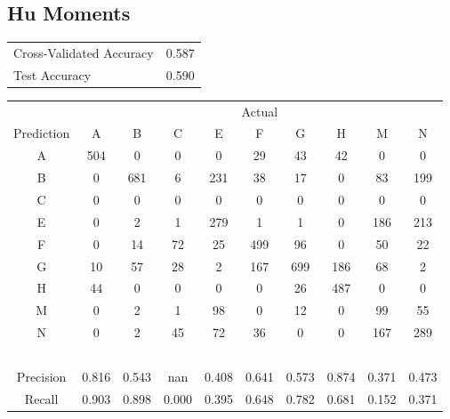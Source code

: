 \documentclass[12pt]{article}
\begin{document}
\newpage
\subsection*{Hu Moments}

\begin{center}
	\begin{tabular}{l|c}
	Cross-Validated Accuracy & 0.587 \\
	Test Accuracy & 0.590 \\
	\end{tabular}

\vspace{1em}

    \begin{tabular}{c|ccccccccc}
	& \multicolumn{9}{c}{Actual} \\ 
     Prediction         & A     & B     & C     & E     & F     & G     & H     & M     & N     \\ \hline
    A         & 504   & 0     & 0     & 0     & 29    & 43    & 42    & 0     & 0     \\
    B         & 0     & 681   & 6     & 231   & 38    & 17    & 0     & 83    & 199   \\
    C         & 0     & 0     & 0     & 0     & 0     & 0     & 0     & 0     & 0     \\
    E         & 0     & 2     & 1     & 279   & 1     & 1     & 0     & 186   & 213   \\
    F         & 0     & 14    & 72    & 25    & 499   & 96    & 0     & 50    & 22    \\
    G         & 10    & 57    & 28    & 2     & 167   & 699   & 186   & 68    & 2     \\
    H         & 44    & 0     & 0     & 0     & 0     & 26    & 487   & 0     & 0     \\
    M         & 0     & 2     & 1     & 98    & 0     & 12    & 0     & 99    & 55    \\
    N         & 0     & 2     & 45    & 72    & 36    & 0     & 0     & 167   & 289   \\
    ~         & ~     & ~     & ~     & ~     & ~     & ~     & ~     & ~     & ~     \\
    Precision & 0.816 & 0.543 & nan   & 0.408 & 0.641 & 0.573 & 0.874 & 0.371 & 0.473 \\
    Recall    & 0.903 & 0.898 & 0.000 & 0.395 & 0.648 & 0.782 & 0.681 & 0.152 & 0.371 \\
    \end{tabular}
\vspace{1em}



\end{center}
\end{document}
